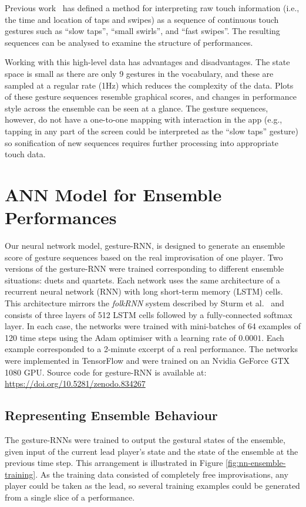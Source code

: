 \documentclass[sigchi]{acmart} %
\begin{document}
Previous work~\cite{Martin:2015jk} has defined a method for interpreting raw touch
information (i.e., the time and location of taps and swipes) as a
sequence of continuous touch gestures such as
``slow taps'', ``small swirls'', and ``fast swipes''. The resulting
sequences can be analysed to examine the structure of performances.

Working with this high-level data has advantages and disadvantages.
The state space is small as there are only 9 gestures in the vocabulary,
and these are sampled at a regular rate (1Hz) which reduces the
complexity of the data. Plots of these gesture sequences resemble
graphical scores, and changes in performance style across the ensemble
can be seen at a glance. The gesture sequences, however, do not have a
one-to-one mapping with interaction in the app (e.g., tapping in any
part of the screen could be interpreted as the ``slow taps'' gesture)
so sonification of new sequences requires further processing into
appropriate touch data.

\section{ANN Model for Ensemble Performances}

Our neural network model, gesture-RNN, is designed to generate an
ensemble score of gesture sequences based on the real improvisation of
one player. Two versions of the gesture-RNN were trained corresponding
to different ensemble situations: duets and quartets. Each network
uses the same architecture of a recurrent neural network (RNN) with
long short-term memory (LSTM) cells. This architecture mirrors the
\emph{folkRNN} system described by Sturm et al.~\cite{Sturm:2016rz}
and consists of three layers of 512 LSTM cells followed by a
fully-connected softmax layer. In each case, the networks were trained
with mini-batches of 64 examples of 120
time steps using the Adam optimiser with a learning
rate of $0.0001$. Each example corresponded to a 2-minute
excerpt of a real performance. The networks were
implemented in TensorFlow and were trained on an Nvidia GeForce GTX
1080 GPU. Source code for gesture-RNN is available at:
\url{https://doi.org/10.5281/zenodo.834267}

\subsection{Representing Ensemble Behaviour}

The gesture-RNNs were trained to output the gestural states of the
ensemble, given input of the current lead player's state and the state
of the ensemble at the previous time step. This arrangement is
illustrated in Figure \ref{fig:nn-ensemble-training}. As the training
data consisted of completely free improvisations, any player could be
taken as the lead, so several training examples could be generated from
a single slice of a performance.
\end{document}
